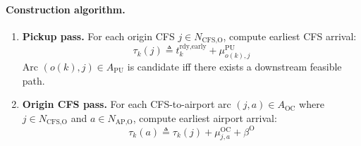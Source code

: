 \documentclass[11pt,a4paper]{article}
\newcommand{\defeq}{\triangleq}
\theoremstyle{definition}
\begin{document}
\paragraph{Construction algorithm.}
\begin{enumerate}
  \item \textbf{Pickup pass.} For each origin CFS $j \in N_{\text{CFS,O}}$, compute earliest
        CFS arrival:
        \[
          \tau_k(j) \defeq t_k^{\text{rdy,early}} + \mu_{o(k),j}^{\text{PU}}
        \]
        Arc $(o(k), j) \in A_{\text{PU}}$ is candidate iff there exists a downstream feasible path.

  \item \textbf{Origin CFS pass.} For each CFS-to-airport arc $(j, a) \in A_{\text{OC}}$ where
        $j \in N_{\text{CFS,O}}$ and $a \in N_{\text{AP,O}}$, compute earliest airport arrival:
        \[
          \tau_k(a) \defeq \tau_k(j) + \mu_{j,a}^{\text{OC}} + \beta^{\text{O}}
        \]


\end{enumerate}
\end{document}
